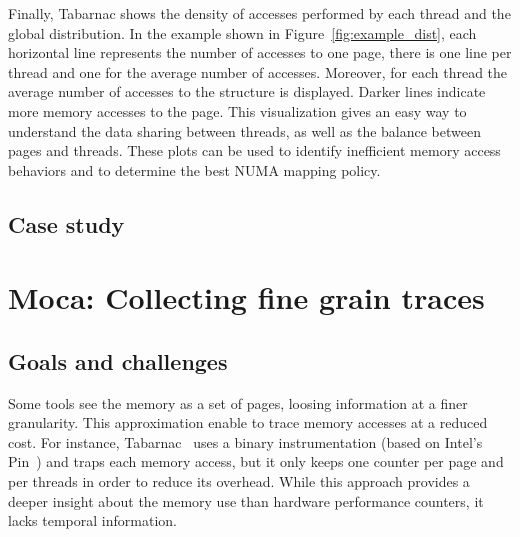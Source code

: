 Finally, \gls{Tabarnac} shows the density of accesses performed by each thread and
the global distribution. In the example shown in Figure~\ref{fig:example_dist}, each
horizontal line represents the number of accesses to one page, there is one
line per thread and one for the average number of accesses. Moreover, for each
thread the average number of accesses to the structure is displayed.
Darker lines indicate more memory accesses to the page. This visualization gives an easy way
to understand the data sharing between threads, as well as the balance between pages and
threads. These plots can be used to identify inefficient memory access behaviors and to
determine the best NUMA mapping policy.

\subsection{Case study}



\section{Moca: Collecting fine grain traces}
\label{sec:Moca}

\subsection{Goals and challenges}


Some tools see the memory as a set of pages, loosing information at a finer
granularity. This approximation enable to trace memory accesses at a reduced
cost. For instance, \gls{Tabarnac}~\cite{Beniamine15TABARNAC} uses a binary
instrumentation (based on Intel's Pin~\cite{Luk05Pin}) and traps each
memory access, but it only keeps one counter per page and per threads in order to
reduce its overhead. While this approach provides a deeper insight about the
memory use than hardware performance counters, it lacks temporal information.





